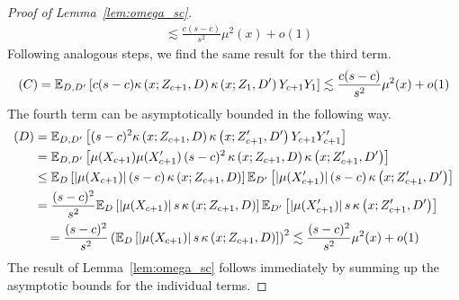 \begin{proof}[Proof of Lemma~\ref{lem:omega_sc}]
\begin{equation}
\begin{aligned}
			 & \lesssim \frac{c(s-c)}{s^2}\mu^2(x) + o(1)
		\end{aligned}
	\end{equation}
	Following analogous steps, we find the same result for the third term.
	\begin{equation}
		\begin{aligned}
			(C)
            = \mathbb{E}_{D, D^{\prime}}\left[c(s-c) \kappa\left(x; Z_{c+1}, D\right)\kappa\left(x; Z_{1}, D^{\prime}\right)Y_{c+1}Y_{1}\right]
			\lesssim \frac{c(s-c)}{s^2}\mu^2(x) + o(1)
		\end{aligned}
	\end{equation}
	The fourth term can be asymptotically bounded in the following way.
	\begin{equation}
		\begin{aligned}
			(D)
            & = \mathbb{E}_{D, D^{\prime}}\left[(s-c)^2 \kappa\left(x; Z_{c+1}, D\right)\kappa\left(x; Z_{c+1}^{\prime}, D^{\prime}\right)Y_{c+1}Y_{c+1}^{\prime}\right]                                           \\
			 & = \mathbb{E}_{D, D^{\prime}}\left[\mu(X_{c+1})\mu(X_{c+1}^{\prime})\, (s-c)^2 \, \kappa\left(x; Z_{c+1}, D\right)\kappa\left(x; Z_{c+1}^{\prime}, D^{\prime}\right)\right] \\
			 & \leq \mathbb{E}_{D}\left[|\mu(X_{c+1})|\, (s-c) \, \kappa\left(x; Z_{c+1}, D\right)\right]
			\mathbb{E}_{D^{\prime}}\left[|\mu(X_{c+1}^{\prime})|\, (s-c) \, \kappa\left(x; Z_{c+1}^{\prime}, D^{\prime}\right)\right]                                                                                      \\
			 & = \frac{(s-c)^2}{s^2} \mathbb{E}_{D}\left[|\mu(X_{c+1})|\, s \, \kappa\left(x; Z_{c+1}, D\right)\right]
			\mathbb{E}_{D^{\prime}}\left[|\mu(X_{c+1}^{\prime})|\, s \, \kappa\left(x; Z_{c+1}^{\prime}, D^{\prime}\right)\right]                                                                                          \\
			 & \quad = \frac{(s-c)^2}{s^2} \left(\mathbb{E}_{D}\left[|\mu(X_{c+1})|\, s \, \kappa\left(x; Z_{c+1}, D\right)\right]\right)^2                                                                        
			\lesssim \frac{(s-c)^2}{s^2}\mu^2(x) + o(1)
		\end{aligned}
	\end{equation}
	The result of Lemma~\ref{lem:omega_sc} follows immediately by summing up the asymptotic bounds for the individual terms.
\end{proof}

